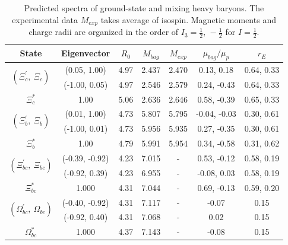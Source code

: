 \documentclass[prd,twocolumn,floatfix,nofootinbib]{revtex4}
\begin{document}
\renewcommand{\tabcolsep}{0.72cm}
\renewcommand{\arraystretch}{1.3}
\begin{table}[!htbp]
    \caption{Predicted spectra of ground-state and mixing heavy baryons. The experimental data $M_{exp}$ takes average of isospin.
    Magnetic moments and charge radii are organized in the order of $I_{3}=\frac{1}{2},\,-\frac{1}{2}$ for $I=\frac{1}{2}$.}
    \label{tab:mixingbaryon}
    \begin{tabular}{ccccccc}
        \hline\hline
        {\rm State}         &{\rm Eigenvector}  &$R_{0}$    &$M_{bag}$  &$M_{exp}$  &$\mu_{bag}/\mu_{p}$    &$r_{E}$ \\ \hline
        \multirow{2}{*}{$\left(\Xi_{c}^{\prime},\ \Xi_{c}\right)$}
                            &(0.05, 1.00)       &4.97	    &2.437	    &2.470      &0.13, 0.18             &0.64, 0.33 \\ 
                            &(-1.00, 0.05)      &4.97	    &2.546	    &2.579      &0.24, -0.43            &0.64, 0.33 \\ 
        $\Xi_{c}^{\ast}$ 	&1.00               &5.06	    &2.636	    &2.646      &0.58, -0.39            &0.65, 0.33 \\ 
        \multirow{2}{*}{$\left(\Xi_{b}^{\prime},\ \Xi_{b}\right)$}
                            &(0.01, 1.00)       &4.73	    &5.807	    &5.795      &-0.04, -0.03           &0.30, 0.61 \\ 
                            &(-1.00, 0.01)      &4.73	    &5.956	    &5.935      &0.27, -0.35            &0.30, 0.61 \\ 
        $\Xi_{b}^{\ast}$ 	&1.00               &4.79	    &5.991	    &5.954      &0.34, -0.58            &0.31, 0.62 \\ 
        \multirow{2}{*}{$\left(\Xi_{bc}^{\prime},\ \Xi_{bc}\right)$}
                            &(-0.39, -0.92)     &4.23	    &7.015	    &-          &0.53, -0.12            &0.58, 0.19 \\ 
                            &(-0.92, 0.39)      &4.23	    &6.955	    &-          &-0.08, 0.03            &0.58, 0.19 \\ 
        $\Xi_{bc}^{\ast}$ 	&1.000              &4.31	    &7.044	    &-          &0.69, -0.13            &0.59, 0.20 \\ 
        \multirow{2}{*}{$\left(\Omega_{bc}^{\prime},\ \Omega_{bc}\right)$}
                            &(-0.40, -0.92)     &4.31	    &7.117	    &-          &-0.07                  &0.15 \\ 
                            &(-0.92, 0.40)      &4.31	    &7.068	    &-          &0.02                   &0.15 \\ 
        $\Omega_{bc}^{\ast}$&1.000              &4.37	    &7.143	    &-          &-0.08                  &0.15 \\ 
        \hline\hline
    \end{tabular}
\end{table}
\end{document}
